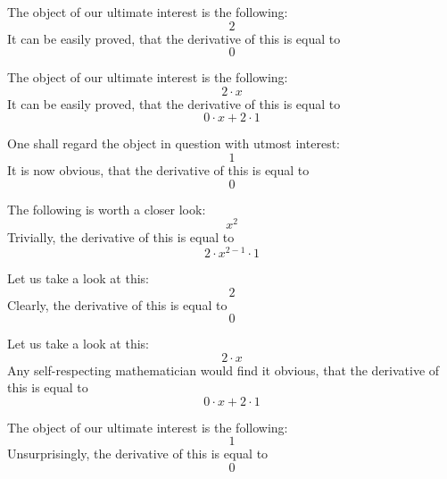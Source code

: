 \documentclass{article}
\begin{document}
The object of our ultimate interest is the following:
\begin{equation}
2 
\end{equation}
It can be easily proved, that the derivative of this is equal to
\begin{equation}
0 
\end{equation}

The object of our ultimate interest is the following:
\begin{equation}
2 \cdot x 
\end{equation}
It can be easily proved, that the derivative of this is equal to
\begin{equation}
0 \cdot x + 2 \cdot 1 
\end{equation}

One shall regard the object in question with utmost interest:
\begin{equation}
1 
\end{equation}
It is now obvious, that the derivative of this is equal to
\begin{equation}
0 
\end{equation}

The following is worth a closer look:
\begin{equation}
x ^{2 } 
\end{equation}
Trivially, the derivative of this is equal to
\begin{equation}
2 \cdot x ^{2 - 1 } \cdot 1 
\end{equation}

Let us take a look at this:
\begin{equation}
2 
\end{equation}
Clearly, the derivative of this is equal to
\begin{equation}
0 
\end{equation}

Let us take a look at this:
\begin{equation}
2 \cdot x 
\end{equation}
Any self-respecting mathematician would find it obvious, that the derivative of this is equal to
\begin{equation}
0 \cdot x + 2 \cdot 1 
\end{equation}

The object of our ultimate interest is the following:
\begin{equation}
1 
\end{equation}
Unsurprisingly, the derivative of this is equal to
\begin{equation}
0 
\end{equation}
\end{document}
